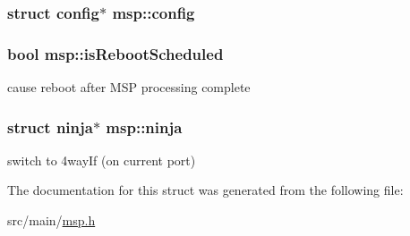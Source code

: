 \hypertarget{structmsp_a3169ee8fa0ac315bd714ad444f2ed3b2}{
\subsubsection[{config}]{\setlength{\rightskip}{0pt plus 5cm}struct {\bf config}$\ast$ msp\+::config}}\label{structmsp_a3169ee8fa0ac315bd714ad444f2ed3b2}
\hypertarget{structmsp_adadce01cb42b5adb014145212121a7bd}{
\subsubsection[{is\+Reboot\+Scheduled}]{\setlength{\rightskip}{0pt plus 5cm}bool msp\+::is\+Reboot\+Scheduled}}\label{structmsp_adadce01cb42b5adb014145212121a7bd}


cause reboot after M\+S\+P processing complete 

\hypertarget{structmsp_a003349a30290f00d554415f1b3ea456e}{
\subsubsection[{ninja}]{\setlength{\rightskip}{0pt plus 5cm}struct {\bf ninja}$\ast$ msp\+::ninja}}\label{structmsp_a003349a30290f00d554415f1b3ea456e}


switch to 4way\+If (on current port) 



The documentation for this struct was generated from the following file\+:\begin{DoxyCompactItemize}
\item 
src/main/\hyperlink{msp_8h}{msp.\+h}\end{DoxyCompactItemize}
